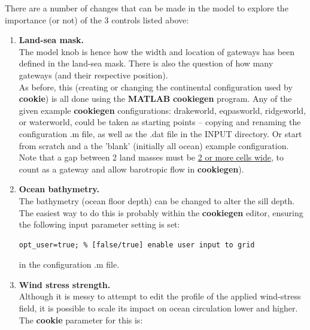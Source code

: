 There are a number of changes that can be made in the model to explore the importance (or not) of the 3 controls listed above:
\vspace{1mm}

\begin{enumerate}
\vspace{1mm}
\item \textbf{Land-sea mask.}
\vspace{1mm}
\\The model knob is hence how the width and location of gateways has been defined in the land-sea mask. There is also the question of how many gateways (and their respective position).
\\As before, this (creating or changing the continental configuration used by \textbf{cookie}) is all done using the \textbf{MATLAB} \textbf{cookiegen} program. Any of the given example \textbf{cookiegen} configurations: \textsf{\footnotesize drakeworld}, \textsf{\footnotesize eqpasworld}, \textsf{\footnotesize ridgeworld}, or \textsf{\footnotesize waterworld}, could be taken as starting points -- copying and renaming the configuration \textsf{\footnotesize .m} file, as well as the \textsf{\footnotesize .dat} file in the \textsf{\footnotesize INPUT} directory.
Or start from scratch and a the 'blank' (initially all ocean) example configuration.\vspace{1mm}
\\Note that a gap between 2 land masses must be \uline{2 or more cells wide}, to count as a gateway and allow barotropic flow in \textbf{cookiegen}).
\vspace{1mm}
\item \textbf{Ocean bathymetry.}
\vspace{1mm}
\\The bathymetry (ocean floor depth) can be changed to alter the sill depth. The easiest way to do this is probably within the \textbf{cookiegen} editor, ensuring the following input parameter setting is set:
\vspace{-1mm}\small\begin{verbatim}
opt_user=true; % [false/true] enable user input to grid
\end{verbatim}\normalsize\vspace{-1mm}
in the configuration \textsf{\footnotesize .m} file.
\vspace{1mm}
\item \textbf{Wind stress strength.}
\vspace{1mm}
\\Although it is messy to attempt to edit the profile of the applied wind-stress field, it is possible to scale its impact on ocean circulation lower and higher. The \textbf{cookie} parameter for this is:

\end{enumerate}
